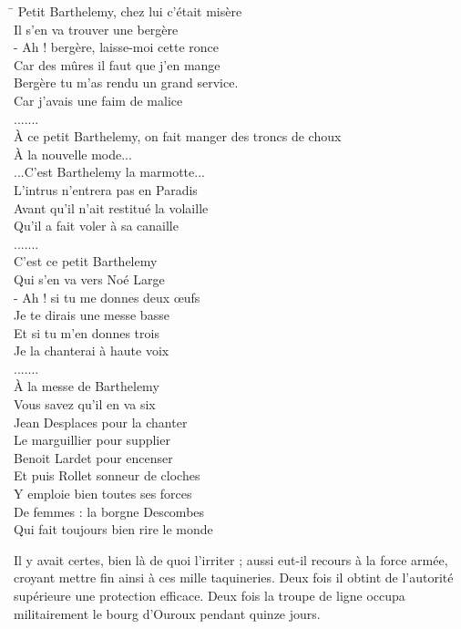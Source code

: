 \begin{tabbing}
\hspace{0.08\textwidth}\=\kill
\>Petit Barthelemy, chez lui c'était misère\\
\>Il s'en va trouver une bergère\\
\>- Ah ! bergère, laisse-moi cette ronce\\
\>Car des mûres il faut que j'en mange\\
\>Bergère tu m'as rendu un grand service.\\
\>Car j'avais une faim de malice\\
\>.......\\
\>À ce petit Barthelemy, on fait manger des troncs de choux\\
\>À la nouvelle mode...\\
\>...C'est Barthelemy la marmotte...\\
\>L'intrus n'entrera pas en Paradis\\
\>Avant qu'il n'ait restitué la volaille\\
\>Qu'il a fait voler à sa canaille\\
\>.......\\
\>C'est ce petit Barthelemy\\
\>Qui s'en va vers Noé Large\\
\>- Ah ! si tu me donnes deux œufs\\
\>Je te dirais une messe basse\\
\>Et si tu m'en donnes trois\\
\>Je la chanterai à haute voix\\
\>.......\\
\>À la messe de Barthelemy\\
\>Vous savez qu'il en va six\\
\>Jean Desplaces pour la chanter\\
\>Le marguillier pour supplier\\
\>Benoit Lardet pour encenser\\
\>Et puis Rollet sonneur de cloches\\
\>Y emploie bien toutes ses forces\\
\>De femmes : la borgne Descombes\\
\>Qui fait toujours bien rire le monde
\end{tabbing}

Il y avait certes, bien là de quoi l'irriter ; aussi eut-il recours à la force armée, croyant mettre fin ainsi à ces mille taquineries. Deux fois il obtint de l'autorité supérieure une protection efficace. Deux fois la troupe de ligne occupa militairement le bourg d'Ouroux pendant quinze jours.


